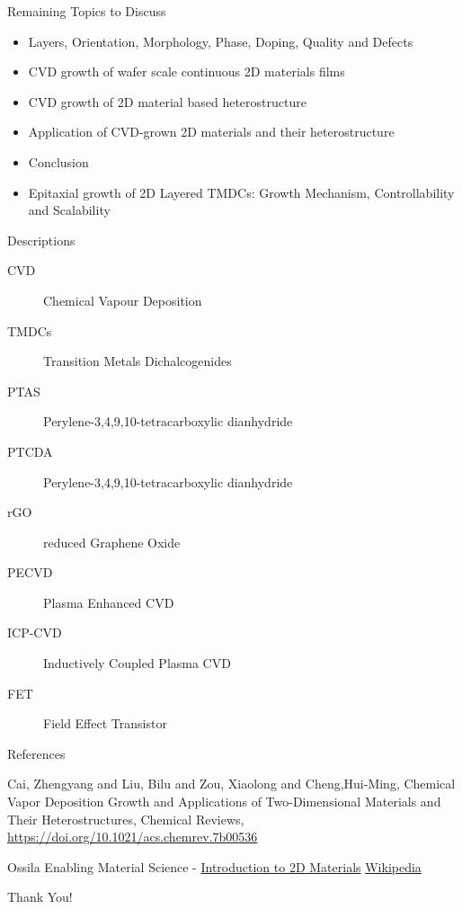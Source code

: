 \documentclass{beamer}
\begin{document}
\begin{frame}{Remaining Topics to Discuss}
    \begin{itemize}
        \item Layers, Orientation, Morphology, Phase, Doping, Quality and Defects
        \item CVD growth of wafer scale continuous 2D materials films
        \item CVD growth of 2D material based heterostructure
        \item Application of CVD-grown 2D materials and their heterostructure
        \item Conclusion
        \item Epitaxial growth of 2D Layered TMDCs: Growth Mechanism, Controllability and Scalability
    \end{itemize}
\end{frame}

\begin{frame}{Descriptions}
\begin{description}
\item[CVD] Chemical Vapour Deposition
\item[TMDCs] Transition Metals Dichalcogenides
\item[PTAS] Perylene-3,4,9,10-tetracarboxylic dianhydride
\item[PTCDA] Perylene-3,4,9,10-tetracarboxylic dianhydride
\item[rGO] reduced Graphene Oxide
\item [PECVD] Plasma Enhanced CVD
\item[ICP-CVD] Inductively Coupled Plasma CVD
\item[FET] Field Effect Transistor
\end{description}
\end{frame}

\begin{frame}{References}
    \begin{thebibliography}{10}
    Cai, Zhengyang and Liu, Bilu and Zou, Xiaolong and Cheng,Hui-Ming, Chemical Vapor Deposition Growth and Applications of Two-Dimensional Materials and Their Heterostructures, Chemical Reviews, \href{https://doi.org/10.1021/acs.chemrev.7b00536}{https://doi.org/10.1021/acs.chemrev.7b00536}
    
     Ossila Enabling Material Science - \href{https://www.ossila.com/pages/introduction-2d-materials}{Introduction to 2D Materials}
     \href{https://www.wikipedia.org/}{Wikipedia}
    \end{thebibliography}
\end{frame}

\begin{frame}
\begin{center}
{\fontsize{40}{50}\selectfont Thank You!}
\end{center}
\end{frame}
\end{document}
